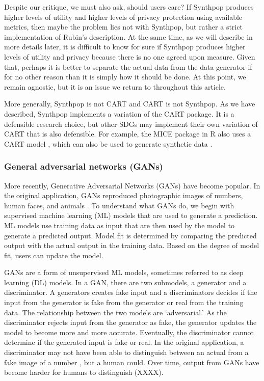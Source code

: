 \documentclass[runningheads]{llncs}
\begin{document}
Despite our critique, we must also ask, should users care?  If Synthpop produces higher levels of utility and higher levels of privacy protection using available metrics, then maybe the problem lies not with Synthpop, but rather a strict implementation of Rubin's description.  At the same time, as we will describe in more details later, it is difficult to know for sure if Synthpop produces higher levels of utility and privacy because there is no one agreed upon measure.  Given that, perhaps it is better to separate the actual data from the data generator if for no other reason than it is simply how it should be done.  At this point, we remain agnostic, but it is an issue we return to throughout this article.

More generally, Synthpop is not CART and CART is not Synthpop.  As we have described, Synthpop implements a variation of the CART package.  It is a defensible research choice, but other SDGs may implement their own variation of CART that is also defensible.  For example, the MICE package in R also uses a CART model \citep{van2011mice}, which can also be used to generate synthetic data \citep{volker2021anony}.  

\subsubsection{General adversarial networks (GANs)}

More recently, Generative Adversarial Networks (GANs) have become popular.  In the original application, GANs reproduced photographic images of numbers, human faces, and animals \citep{goodfellow2014generative}.  To understand what GANs do, we begin with supervised machine learning (ML) models that are used to generate a prediction.  ML models use training data as input that are then used by the model to generate a predicted output.  Model fit is determined by comparing the predicted output with the actual output in the training data.  Based on the degree of model fit, users can update the model.  

GANs are a form of unsupervised ML models, sometimes referred to as deep learning (DL) models.  In a GAN, there are two submodels, a generator and a discriminator.  A generators creates fake input and a discriminators decides if the input from the generator is fake from the generator or real from the training data.  The relationship between the two models are `adversarial.'  As the discriminator rejects input from the generator as fake, the generator updates the model to become more and more accurate.  Eventually, the discriminator cannot determine if the generated input is fake or real.  In the original application, a discriminator may not have been able to distinguish between an actual from a fake image of a number \citep{goodfellow2014generative}, but a human could.  Over time, output from GANs have become harder for humans to distinguish (XXXX).
\end{document}
